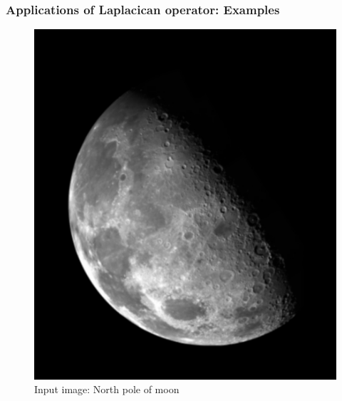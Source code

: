 \documentclass[english,11pt,table,handout]{beamer}
\begin{document}
{
	\frametitle{Applications of Laplacican operator: Examples}
	\begin{figure}[!h]
		\includegraphics[scale=0.4]{north_pole.jpg}
		\caption{Input image: North pole of moon}
	\end{figure}	
}
\frame
\end{document}
